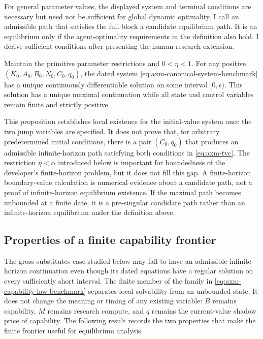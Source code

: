 For general parameter values, the displayed system and terminal conditions are
necessary but need not be sufficient for global dynamic optimality. I call an
admissible path that satisfies the full block a candidate equilibrium path. It
is an equilibrium only if the agent-optimality requirements in the definition
also hold. I derive sufficient conditions after presenting the human-research
extension.

\begin{proposition}
\label{prop:axm-local-canonical-existence}
Maintain the primitive parameter restrictions and \(0<\eta<1\). For any
positive \((K_0,A_0,B_0,N_0,C_0,q_0)\), the dated system
\eqref{eq:axm-canonical-system-benchmark} has a unique continuously
differentiable solution on some interval \([0,\epsilon)\). This solution has a
unique maximal continuation while all state and control variables remain finite
and strictly positive.
\end{proposition}

This proposition establishes local existence for the initial-value system once
the two jump variables are specified. It does not prove that, for arbitrary
predetermined initial conditions, there is a pair \((C_0,q_0)\) that produces an
admissible infinite-horizon path satisfying both conditions in
\eqref{eq:axm-tvc}. The restriction \(\eta<\alpha\) introduced below is important
for boundedness of the developer's finite-horizon problem, but it does not fill
this gap. A finite-horizon boundary-value calculation is numerical evidence
about a candidate path, not a proof of infinite-horizon equilibrium existence.
If the maximal path becomes unbounded at a finite date, it is a pre-singular
candidate path rather than an infinite-horizon equilibrium under the definition
above.

\subsection{Properties of a finite capability frontier}
\label{sec:axm-finite-cap-regularization}

The gross-substitutes case studied below may fail to have an admissible
infinite-horizon continuation even though its dated equations have a regular
solution on every sufficiently short interval. The finite member of the family
in \eqref{eq:axm-capability-law-benchmark} separates local solvability from an
unbounded state. It does not change the meaning or timing of any existing
variable: \(B\) remains capability, \(M\) remains research compute, and \(q\)
remains the current-value shadow price of capability. The following result
records the two properties that make the finite frontier useful for equilibrium
analysis.

